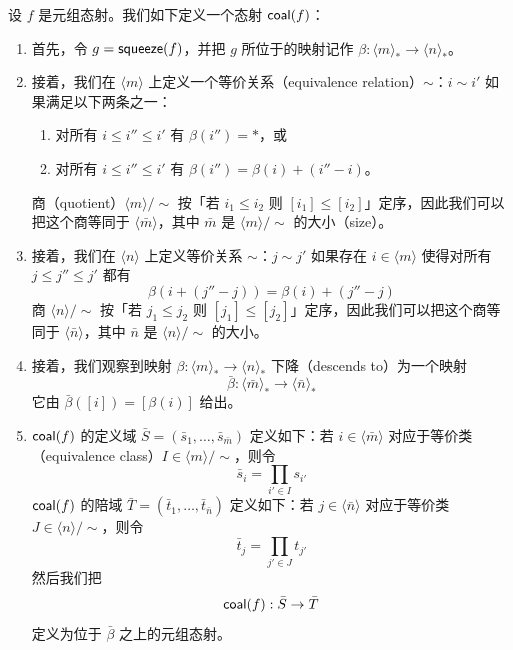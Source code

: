 \begin{construction}\label{constructionofcoalesceofmorphisminC}
    设 $f$ 是元组态射。我们如下定义一个态射 $\mathsf{coal}(f)$：
    \begin{enumerate}
    \item 首先，令 $g = \mathsf{squeeze}(f)$，并把 $g$ 所位于的映射记作 $\beta:\langle m \rangle_* \to \langle n \rangle_*$。 
        \item 接着，我们在 $\langle m \rangle$ 上定义一个等价关系（equivalence relation）$\sim$：$i \sim i'$ 如果满足以下两条之一：
        \begin{enumerate}
            \item 对所有 $i \leq i'' \leq i'$ 有 $\beta(i'') = *$，或 
            \item 对所有 $i \leq i'' \leq i'$ 有 $\beta(i'') = \beta(i) + (i'' - i)$。 
        \end{enumerate}
        商（quotient）$\langle m \rangle / \sim$ 按「若 $i_1 \leq i_2$ 则 $[i_1] \leq [i_2]$」定序，因此我们可以把这个商等同于 $\langle \bar{m} \rangle$，其中 $\bar{m}$ 是 $\langle m \rangle / \sim$ 的大小（size）。 
        \item 接着，我们在 $\langle n \rangle$ 上定义等价关系 $\sim$：$j \sim j'$ 如果存在 $i \in \langle m \rangle$ 使得对所有 $j \leq j'' \leq j'$ 都有
        \[\beta(i + (j''-j)) = \beta(i) + (j'' - j)\]
        商 $\langle n \rangle / \sim$ 按「若 $j_1 \leq j_2$ 则 $[j_1] \leq [j_2]$」定序，因此我们可以把这个商等同于 $\langle \bar{n} \rangle$，其中 $\bar{n}$ 是 $\langle n \rangle / \sim$ 的大小。 
        \item 接着，我们观察到映射 $\beta:\langle m \rangle_* \to \langle n \rangle_*$ 下降（descends to）为一个映射
        \[
        \bar{\beta}: \langle \bar{m} \rangle_* \to \langle \bar{n} \rangle_*
        \]
        它由 $\bar{\beta}([i]) = [\beta(i)]$ 给出。
        \item $\mathsf{coal}(f)$ 的定义域 $\bar{S} = (\bar{s}_1,\dots,\bar{s}_{\bar{m}})$ 定义如下：若 $i \in \langle \bar{m} \rangle$ 对应于等价类（equivalence class）$I \in \langle m \rangle / \sim$，则令
        \[
        \bar{s}_i = \prod_{i' \in I} s_{i'}
        \]
        $\mathsf{coal}(f)$ 的陪域 $\bar{T} = (\bar{t}_1,\dots,\bar{t}_{\bar{n}})$ 定义如下：若 $j \in \langle \bar{n} \rangle$ 对应于等价类 $J \in \langle n \rangle / \sim$，则令
        \[
        \bar{t}_j = \prod_{j' \in J} t_{j'}
        \]
        然后我们把 \[\mathsf{coal}(f):\bar{S} \to \bar{T}\] 定义为位于 $\bar{\beta}$ 之上的元组态射。 
    \end{enumerate}
\end{construction}
\color{black}

